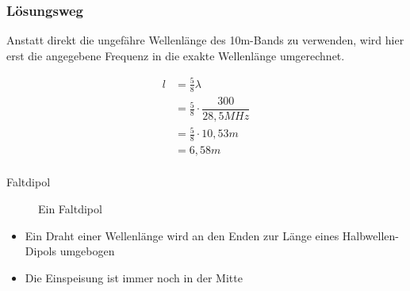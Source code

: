 \begin{frame}
    \frametitle{Lösungsweg}
    Anstatt direkt die ungefähre Wellenlänge des 10m-Bands zu verwenden, wird hier erst die angegebene Frequenz in die exakte Wellenlänge umgerechnet.

    \begin{equation} \begin{split} l &= \frac{5}{8}\lambda\\ &= \frac{5}{8} \cdot \dfrac{300}{28,5MHz}\\ &= \frac{5}{8} \cdot 10,53m\\ &= 6,58m\\ \end{split} \end{equation}

\end{frame}

\begin{frame}{Faltdipol}
    \begin{figure}
        \caption{\scriptsize Ein Faltdipol}
        \label{e_antenne_laenge_resonanz}
    \end{figure}
    \begin{itemize}
        \item Ein Draht einer Wellenlänge wird an den Enden zur Länge eines Halbwellen-Dipols umgebogen
        \item Die Einspeisung ist immer noch in der Mitte
    \end{itemize}
\end{frame}

\begin{frame}
\end{frame}%
